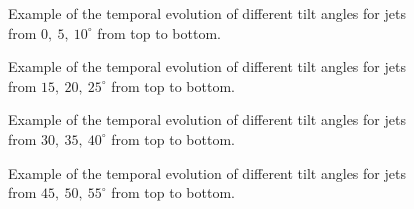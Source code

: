 \documentclass[12pt]{ociamthesis}
\begin{document}
\begin{figure}
\captionsetup[subfigure]{labelformat=empty}
\centering
{}
\caption{Example of the temporal evolution of different tilt angles for jets from $0,~5,~10^{\circ}$ from top to bottom.}
\label{tj_morph_1}
\end{figure}
\begin{figure}
\captionsetup[subfigure]{labelformat=empty}
\centering
{}
\caption{Example of the temporal evolution of different tilt angles for jets from $15,~20,~25^{\circ}$ from top to bottom.}
\label{tj_morph_2}
\end{figure}
\begin{figure}
\captionsetup[subfigure]{labelformat=empty}
\centering
{}
\caption{Example of the temporal evolution of different tilt angles for jets from $30,~35,~40^{\circ}$ from top to bottom.}
\label{tj_morph_3}
\end{figure}
\begin{figure}
\captionsetup[subfigure]{labelformat=empty}
\centering
{}
\caption{Example of the temporal evolution of different tilt angles for jets from $45,~50,~55^{\circ}$ from top to bottom.}
\label{tj_morph_4}
\end{figure}
\end{document}
